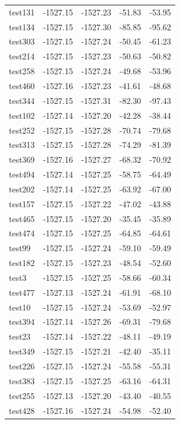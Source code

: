 \documentclass[journal=jacsat,manuscript=article]{achemso}
\begin{document}
\begin{table}[b!]
\begin{tabular}{lrrrr}
test131 &  -1527.15 &  -1527.23 &  -51.83 &  -53.95 \\
test134 &  -1527.15 &  -1527.30 &  -85.85 &  -95.62 \\
test303 &  -1527.15 &  -1527.24 &  -50.45 &  -61.23 \\
test214 &  -1527.15 &  -1527.23 &  -50.63 &  -50.82 \\
test258 &  -1527.15 &  -1527.24 &  -49.68 &  -53.96 \\
test460 &  -1527.16 &  -1527.23 &  -41.61 &  -48.68 \\
test344 &  -1527.15 &  -1527.31 &  -82.30 &  -97.43 \\
test102 &  -1527.14 &  -1527.20 &  -42.28 &  -38.44 \\
test252 &  -1527.15 &  -1527.28 &  -70.74 &  -79.68 \\
test313 &  -1527.15 &  -1527.28 &  -74.29 &  -81.39 \\
test369 &  -1527.16 &  -1527.27 &  -68.32 &  -70.92 \\
test494 &  -1527.14 &  -1527.25 &  -58.75 &  -64.49 \\
test202 &  -1527.14 &  -1527.25 &  -63.92 &  -67.00 \\
test157 &  -1527.15 &  -1527.22 &  -47.02 &  -43.88 \\
test465 &  -1527.15 &  -1527.20 &  -35.45 &  -35.89 \\
test474 &  -1527.15 &  -1527.25 &  -64.85 &  -64.61 \\
test99  &  -1527.15 &  -1527.24 &  -59.10 &  -59.49 \\
test182 &  -1527.15 &  -1527.23 &  -48.54 &  -52.60 \\
test3   &  -1527.15 &  -1527.25 &  -58.66 &  -60.34 \\
test477 &  -1527.13 &  -1527.24 &  -61.91 &  -68.10 \\
test10  &  -1527.15 &  -1527.24 &  -53.69 &  -52.97 \\
test394 &  -1527.14 &  -1527.26 &  -69.31 &  -79.68 \\
test23  &  -1527.14 &  -1527.22 &  -48.11 &  -49.19 \\
test349 &  -1527.15 &  -1527.21 &  -42.40 &  -35.11 \\
test226 &  -1527.15 &  -1527.24 &  -55.58 &  -55.31 \\
test383 &  -1527.15 &  -1527.25 &  -63.16 &  -64.31 \\
test255 &  -1527.13 &  -1527.20 &  -43.40 &  -40.55 \\
test428 &  -1527.16 &  -1527.24 &  -54.98 &  -52.40 \\

\end{tabular}
\end{table}
\end{document}

